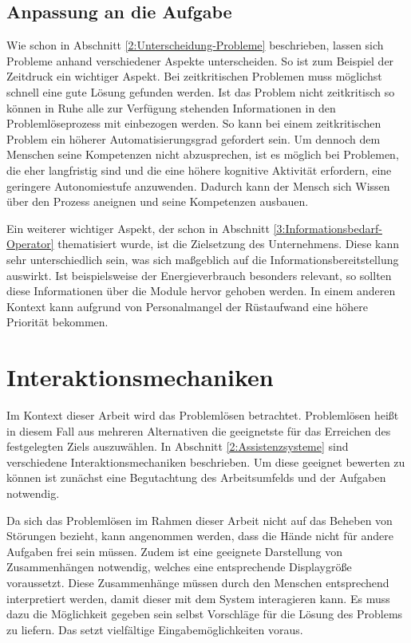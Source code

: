 \subsection{Anpassung an die Aufgabe}
Wie schon in Abschnitt \ref{2:Unterscheidung-Probleme} beschrieben, lassen sich Probleme anhand verschiedener Aspekte unterscheiden. So ist zum Beispiel der Zeitdruck ein wichtiger Aspekt. Bei zeitkritischen Problemen muss möglichst schnell eine gute Lösung gefunden werden. Ist das Problem nicht zeitkritisch so können in Ruhe alle zur Verfügung stehenden Informationen in den Problemlöseprozess mit einbezogen werden. So kann bei einem zeitkritischen Problem ein höherer Automatisierungsgrad gefordert sein. Um dennoch dem Menschen seine Kompetenzen nicht abzusprechen, ist es möglich bei Problemen, die eher langfristig sind und die eine höhere kognitive Aktivität erfordern, eine geringere Autonomiestufe anzuwenden. Dadurch kann der Mensch sich Wissen über den Prozess aneignen und seine Kompetenzen ausbauen.

Ein weiterer wichtiger Aspekt, der schon in Abschnitt \ref{3:Informationsbedarf-Operator} thematisiert wurde, ist die Zielsetzung des Unternehmens. Diese kann sehr unterschiedlich sein, was sich maßgeblich auf die Informationsbereitstellung auswirkt. Ist beispielsweise der Energieverbrauch besonders relevant, so sollten diese Informationen über die Module hervor gehoben werden. In einem anderen Kontext kann aufgrund von Personalmangel der Rüstaufwand eine höhere Priorität bekommen. 

\section{Interaktionsmechaniken}
Im Kontext dieser Arbeit wird das Problemlösen betrachtet. Problemlösen heißt in diesem Fall aus mehreren Alternativen die geeignetste für das Erreichen des festgelegten Ziels auszuwählen. In Abschnitt \ref{2:Assistenzsysteme} sind verschiedene Interaktionsmechaniken beschrieben. Um diese geeignet bewerten zu können ist zunächst eine Begutachtung des Arbeitsumfelds und der Aufgaben notwendig.

Da sich das Problemlösen im Rahmen dieser Arbeit nicht auf das Beheben von Störungen bezieht, kann angenommen werden, dass die Hände nicht für andere Aufgaben frei sein müssen. Zudem ist eine geeignete Darstellung von Zusammenhängen notwendig, welches eine entsprechende Displaygröße voraussetzt. Diese Zusammenhänge müssen durch den Menschen entsprechend interpretiert werden, damit dieser mit dem System interagieren kann. Es muss dazu die Möglichkeit gegeben sein selbst Vorschläge für die Lösung des Problems zu liefern. Das setzt vielfältige Eingabemöglichkeiten voraus.

